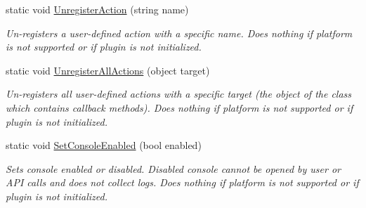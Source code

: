 \begin{DoxyCompactItemize}
static void \mbox{\hyperlink{class_lunar_console_plugin_1_1_lunar_console_a6ae8fe8759e61b25508a43cdadca35c4}{Unregister\+Action}} (string name)
\begin{DoxyCompactList}\small\item\em Un-\/registers a user-\/defined action with a specific name. Does nothing if platform is not supported or if plugin is not initialized. \end{DoxyCompactList}\item 
static void \mbox{\hyperlink{class_lunar_console_plugin_1_1_lunar_console_a27c043192646c8a5b79668e2161db4aa}{Unregister\+All\+Actions}} (object target)
\begin{DoxyCompactList}\small\item\em Un-\/registers all user-\/defined actions with a specific target (the object of the class which contains callback methods). Does nothing if platform is not supported or if plugin is not initialized. \end{DoxyCompactList}\item 
static void \mbox{\hyperlink{class_lunar_console_plugin_1_1_lunar_console_aba91fb5819fc8059c33076d1b7e96966}{Set\+Console\+Enabled}} (bool enabled)
\begin{DoxyCompactList}\small\item\em Sets console enabled or disabled. Disabled console cannot be opened by user or A\+PI calls and does not collect logs. Does nothing if platform is not supported or if plugin is not initialized. \end{DoxyCompactList}\end{DoxyCompactItemize}
